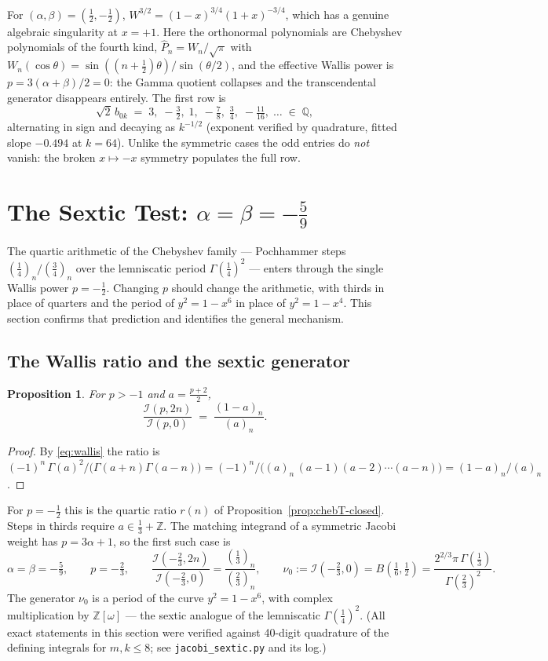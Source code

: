 \documentclass[11pt,a4paper]{article}
\newtheorem{proposition}[theorem]{Proposition}
\newcommand{\Z}{\mathbb{Z}}
\newcommand{\G}{\Gamma}
\begin{document}
For $(\alpha,\beta)=(\tfrac12,-\tfrac12)$, $W^{3/2}=(1-x)^{3/4}(1+x)^{-3/4}$,
which has a genuine algebraic singularity at $x=+1$.
Here the orthonormal polynomials are Chebyshev polynomials of the fourth kind,
$\widehat P_n = W_n/\sqrt\pi$ with $W_n(\cos\theta)=\sin((n+\tfrac12)\theta)/\sin(\theta/2)$,
and the effective Wallis power is $p=3(\alpha+\beta)/2=0$: the Gamma quotient
collapses and the transcendental generator disappears entirely.  The first row is
\[
  \sqrt2\,b_{0k} \;=\; 3,\;-\tfrac32,\;1,\;-\tfrac78,\;\tfrac34,\;-\tfrac{11}{16},\;\ldots
  \;\in\;\mathbb{Q},
\]
alternating in sign and decaying as $k^{-1/2}$ (exponent verified by quadrature,
fitted slope $-0.494$ at $k=64$).  Unlike the symmetric cases the odd entries do
\emph{not} vanish: the broken $x\mapsto-x$ symmetry populates the full row.

\section{The Sextic Test: $\alpha=\beta=-\tfrac{5}{9}$}\label{sec:sextic}

The quartic arithmetic of the Chebyshev family --- Pochhammer steps
$(\tfrac14)_n/(\tfrac34)_n$ over the lemniscatic period $\G(\tfrac14)^2$ ---
enters through the single Wallis power $p=-\tfrac12$.  Changing $p$ should
change the arithmetic, with thirds in place of quarters and the period of
$y^2=1-x^6$ in place of $y^2=1-x^4$.  This section confirms that prediction
and identifies the general mechanism.

\subsection{The Wallis ratio and the sextic generator}

\begin{proposition}\label{prop:wallis-ratio}
  For $p>-1$ and $a=\tfrac{p+2}{2}$,
  \[
    \frac{\mathcal{I}(p,2n)}{\mathcal{I}(p,0)} \;=\; \frac{(1-a)_n}{(a)_n}.
  \]
\end{proposition}

\begin{proof}
  By \eqref{eq:wallis} the ratio is
  $(-1)^n\,\G(a)^2/\bigl(\G(a+n)\G(a-n)\bigr)
  =(-1)^n/\bigl((a)_n\,(a-1)(a-2)\cdots(a-n)\bigr)=(1-a)_n/(a)_n$.
\end{proof}

For $p=-\tfrac12$ this is the quartic ratio $r(n)$ of
Proposition~\ref{prop:chebT-closed}.  Steps in thirds require
$a\in\tfrac13+\Z$.  The matching integrand of a symmetric Jacobi weight has
$p=3\alpha+1$, so the first such case is
\[
  \alpha=\beta=-\tfrac59,\qquad p=-\tfrac23,\qquad
  \frac{\mathcal{I}(-\tfrac23,2n)}{\mathcal{I}(-\tfrac23,0)}
  =\frac{(\tfrac13)_n}{(\tfrac23)_n},\qquad
  \nu_0:=\mathcal{I}(-\tfrac23,0)=B(\tfrac16,\tfrac12)
  =\frac{2^{2/3}\pi\,\G(\tfrac13)}{\G(\tfrac23)^2}.
\]
The generator $\nu_0$ is a period of the curve $y^2=1-x^6$, with complex
multiplication by $\Z[\omega]$ --- the sextic analogue of the lemniscatic
$\G(\tfrac14)^2$.  (All exact statements in this section were verified
against 40-digit quadrature of the defining integrals for $m,k\le8$;
see \texttt{jacobi\_sextic.py} and its log.)
\end{document}
